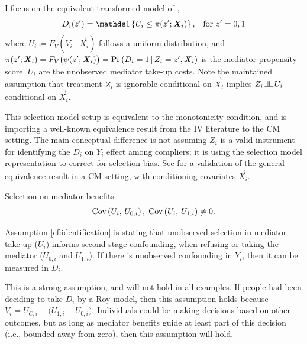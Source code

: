 I focus on the equivalent transformed model of \cite{heckman2005structural},
\[ D_i(z') = \indicator{U_i \leq \pi(z'; \vec X_i)},
    \;\;\; \text{for } z'=0,1 \]
where $U_i \coloneqq F_V\left( V_i \mid \vec X_i \right)$ follows a uniform distribution, and $\pi(z'; \boldsymbol{\mathit{X}}_i) = F_V\big(\psi(z'; \boldsymbol{\mathit{X}}_i)\big) = \Pr\left( D_i = 1 \, \middle\vert \, Z_i = z', \boldsymbol{\mathit{X}}_i \right)$ is the mediator propensity score.
$U_i$ are the unobserved mediator take-up costs.
Note the maintained assumption that treatment $Z_i$ is ignorable conditional on $\vec X_i$ implies $Z_i \indep U_i$ conditional on $\vec X_i$.

This selection model setup is equivalent to the monotonicity condition, and is importing a well-known equivalence result from the IV literature to the CM setting.
The main conceptual difference is not assuming $Z_i$ is a valid instrument for identifying the $D_i$ on $Y_i$ effect among compliers; it is using the selection model representation to correct for selection bias.
See  for a validation of the general \cite{vytlacil2002independence} equivalence result in a CM setting, with conditioning covariates $\vec X_i$.

\begin{assumptionCF}
    \label{cf:identification}
    Selection on mediator benefits.
    \[ \text{Cov} \left( U_i, \, U_{0,i} \right), \; \text{Cov} \left( U_i, \, U_{1,i} \right) \neq 0. \]
\end{assumptionCF}
\noindent
Assumption \ref{cf:identification} is stating that unobserved selection in mediator take-up ($U_i$) informs second-stage confounding, when refusing or taking the mediator ($U_{0,i}$ and $U_{1,i}$).
If there is unobserved confounding in $Y_i$, then it can be measured in $D_i$.

This is a strong assumption, and will not hold in all examples.
If people had been deciding to take $D_i$ by a Roy model, then this assumption holds because $V_i = U_{C,i} - \big( U_{1,i} - U_{0,i} \big)$.
Individuals could be making decisions based on other outcomes, but as long as mediator benefits guide at least part of this decision (i.e., bounded away from zero), then this assumption will hold.


